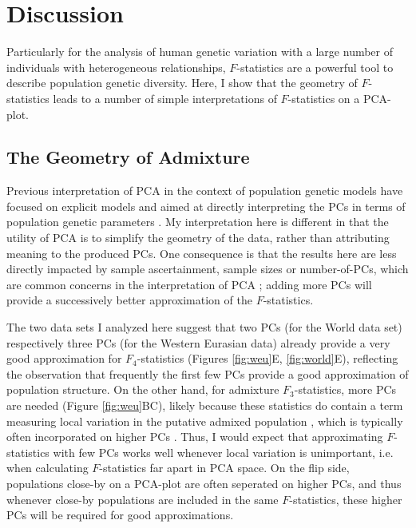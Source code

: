 \documentclass[12pt,fullpage, a4paper]{article}
\begin{document}
\section{Discussion}
Particularly for the analysis of human genetic variation with a large number of individuals with heterogeneous relationships, $F$-statistics  are  a powerful tool to describe population genetic diversity. Here, I show that the geometry of $F$-statistics \citep{oteo-garcia2021} leads to a number of simple interpretations of $F$-statistics on a PCA-plot. 

\subsection{The Geometry of Admixture}
Previous interpretation of PCA in the context of population genetic models have focused on explicit models and aimed at directly interpreting the PCs in terms of population genetic parameters \citep{cavalli-sforza1975, novembre2008a, francois2010, francois2021}. My interpretation here is different in that the utility of PCA is to simplify the geometry of the data, rather than attributing meaning to the produced PCs. One consequence is that the results here are less directly impacted by sample ascertainment, sample sizes or number-of-PCs, which are common concerns in the interpretation of PCA \citep{novembre2008a, mcvean2009, francois2010, francois2021}; adding more PCs will provide a successively better approximation of the $F$-statistics. 

The two data sets I analyzed here suggest that two PCs (for the World data set) respectively three PCs (for the Western Eurasian data) already provide a very good approximation for $F_4$-statistics (Figures \ref{fig:weu}E, \ref{fig:world}E), reflecting the observation that frequently the first few PCs provide a good approximation of population structure. On the other hand, for admixture $F_3$-statistics, more PCs are needed (Figure \ref{fig:weu}BC), likely because these statistics do contain a term measuring local variation in the putative admixed population \citep{peter2016}, which is typically often incorporated on higher PCs \citep{cavalli-sforza1975}. Thus, I would expect that approximating $F$-statistics with few PCs works well whenever local variation is unimportant, i.e. when calculating $F$-statistics far apart in PCA space. On the flip side, populations close-by on a PCA-plot are often seperated on higher PCs, and thus whenever close-by populations are included in the same $F$-statistics, these higher PCs will be required for good approximations.
\end{document}

